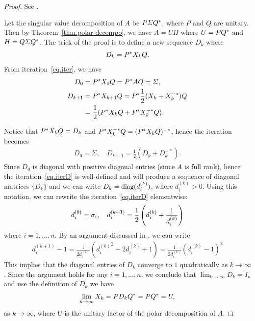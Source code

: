 \begin{proof}
    See .

    Let the singular value decomposition of $A$ be $P \varSigma Q^*$, where $P$ and $Q$ are unitary. Then by Theorem~\ref{thm.polar-decompo}, we have $A = UH$ where $U = PQ^*$ and $H = Q\varSigma Q^*$. The trick of the proof is to define a new sequence ${D_k}$ where 
    \begin{equation}\label{eq.XtoD}
        D_k = P^* X_k Q.
    \end{equation}
    From iteration~\eqref{eq.iter}, we have 
    \begin{equation}\notag
        \begin{aligned}
            D_0 &= P^* X_0 Q = P^* AQ = \varSigma,\\
            D_{k+1} &= P^* X_{k+1} Q = P^* \frac 12 (X_k + X_k^{-*})Q \\
            & = \frac 12 (P^* X_k Q + P^* X_k^{-*}Q).
        \end{aligned}
    \end{equation}

    Notice that $P^* X_k Q = D_k$ and $P^* X_k^{-*}Q = (P^* X_k Q)^{-*}$, hence the iteration becomes 
    \begin{equation}\label{eq.iterD}
        \begin{aligned}
            D_0 = \Sigma, \quad D_{k+1} = \frac 1 2 (D_k + D_k^{-*}).
        \end{aligned}
    \end{equation}
    Since $D_0$ is diagonal with positive diagonal entries (since $A$ is full rank), hence the iteration~\eqref{eq.iterD} is well-defined and will produce a sequence of diagonal matrices $\{D_k\}$ and we can write $D_k = \mathrm{diag}(d_i^{(k)})$, where $d_i^{(k)} > 0$. Using this notation, we can rewrite the iteration~\eqref{eq.iterD} elementwise:
    \begin{equation}\notag
        d_i^{(0)} = \sigma_i,\quad d_i^{(k+1)} = \frac 12 \left(d_i^{(k)} + \frac{1}{d_i^{(k)}}\right)
    \end{equation}
    where $i = 1,\dots,n$. By an argument discussed in , we can write 
    \begin{equation}\label{thm.conv-proof1}
        \begin{aligned}
        d_i^{(k+1)} - 1 = \frac{1}{2d_i^{(k)}}\left({d_i^{(k)}}^2 -2d_i^{(k)} + 1 \right) = \frac{1}{2d_i^{(k)}} \left(d_i^{(k)}-1\right)^2
        \end{aligned}
    \end{equation}
    This implies that the diagonal entries of $D_k$ converge to $1$ quadratically as $k\to\infty$. Since the argument holds for any $i  = 1,\dots,n$, we conclude that $\lim_{k\to\infty} D_k = I_n$ and use the definition of $D_k$ we have 
    \begin{equation}\notag
        \lim_{k\to\infty} X_k = PD_k Q^* = PQ^* = U,
    \end{equation}
    as $k\to\infty$, where $U$ is the unitary factor of the polar decomposition of $A$.
\end{proof}


